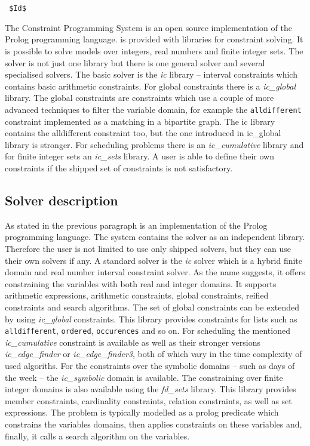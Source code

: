 \section{\eclipse}
\verb= $Id$ =

The \eclipse Constraint Programming System is an open source implementation of 
the Prolog programming language. \eclipse is provided with libraries for constraint 
solving. It is possible to solve models over integers, real numbers and finite 
integer sets. The solver is not just one library but there is one general solver 
and several specialised solvers. The basic solver is the {\em ic} library -- interval 
constraints which contains basic arithmetic constraints. For global constraints there 
is a {\em ic\_global} library. The global constraints are constraints
which use a couple of more advanced techniques to filter the variable domain, for example 
the \texttt{alldifferent} constraint implemented as a matching in a bipartite graph.
The ic library contains the alldifferent constraint too, but the one introduced in
ic\_global library is stronger. For scheduling problems there is an {\em ic\_cumulative}
library and for finite integer sets an {\em ic\_sets} library. A user is able to define their own
constraints if the shipped set of constraints is not satisfactory.

\subsection{Solver description}
As stated in the previous paragraph \eclipse is an implementation of the Prolog programming language.
The system contains the solver as an independent library. Therefore the user is not 
limited to use only shipped solvers, but they can use their own solvers if any.
A standard solver is the {\em ic} solver which is a hybrid finite domain and real number 
interval constraint solver. As the name suggests, it offers constraining the variables with
both real and integer domains. It supports arithmetic expressions, arithmetic constraints,
global constraints, reified constraints and search algorithms. The set of global constraints
can be extended by using {\em ic\_global} constraints. This library provides constraints
for lists such as \texttt{alldifferent}, \texttt{ordered}, \texttt{occurences} and so on.
For scheduling the mentioned {\em ic\_cumulative} constraint is available as well as 
their stronger versions {\em ic\_edge\_finder} or {\em ic\_edge\_finder3}, both of which
vary in the time complexity of used algoriths. For the constraints over the symbolic 
domains -- such as days of the week -- the {\em ic\_symbolic} domain is available.  The 
constraining over finite integer domains is also available using the {\em fd\_sets} library.
This library provides member constraints, cardinality constraints, relation constraints,
as well as set expressions. The problem is typically modelled as a prolog predicate which constrains the variables domains,
then applies constraints on these variables and, finally, it calls a search algorithm 
on the variables. 

